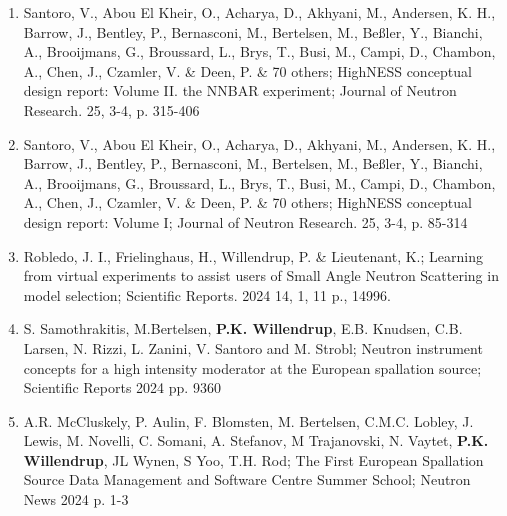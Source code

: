 \begin{enumerate}
    \item Santoro, V., Abou El Kheir, O., Acharya, D., Akhyani, M.,
      Andersen, K. H., Barrow, J., Bentley, P., Bernasconi, M.,
      Bertelsen, M., Beßler, Y., Bianchi, A., Brooijmans, G.,
      Broussard, L., Brys, T., Busi, M., Campi, D., Chambon, A., Chen,
      J., Czamler, V. \& Deen, P. \& 70 others;
      HighNESS conceptual design report: Volume II. the NNBAR
      experiment;
      Journal of Neutron Research. 25, 3-4, p. 315-406
      \\
    \item Santoro, V., Abou El Kheir, O., Acharya, D., Akhyani, M.,
      Andersen, K. H., Barrow, J., Bentley, P., Bernasconi, M.,
      Bertelsen, M., Beßler, Y., Bianchi, A., Brooijmans, G.,
      Broussard, L., Brys, T., Busi, M., Campi, D., Chambon, A., Chen,
      J., Czamler, V. \& Deen, P. \& 70 others; HighNESS conceptual
      design report: Volume I;
      Journal of Neutron Research. 25, 3-4, p. 85-314
      \\
    \item Robledo, J. I., Frielinghaus, H., Willendrup, P. \&
      Lieutenant, K.;
      Learning from virtual experiments to assist users of Small Angle
      Neutron Scattering in model selection;
      Scientific Reports. 2024 14, 1, 11 p., 14996.
      \\
    \item S. Samothrakitis, M.Bertelsen, {\bf P.K. Willendrup},
      E.B. Knudsen, C.B. Larsen, N. Rizzi, L. Zanini,  V. Santoro and
      M. Strobl;
      Neutron instrument concepts for a high intensity moderator at
      the European spallation source;
      Scientific Reports 2024 pp. 9360
      \\
    \item A.R. McCluskely, P. Aulin, F. Blomsten, M. Bertelsen,
      C.M.C. Lobley, J. Lewis, M. Novelli, C. Somani, A. Stefanov, M
      Trajanovski, N. Vaytet, {\bf P.K. Willendrup}, JL Wynen, S Yoo,
      T.H. Rod;
      The First European Spallation Source Data Management and
      Software Centre Summer School; Neutron News 2024 p. 1-3
      \\

\end{enumerate}
